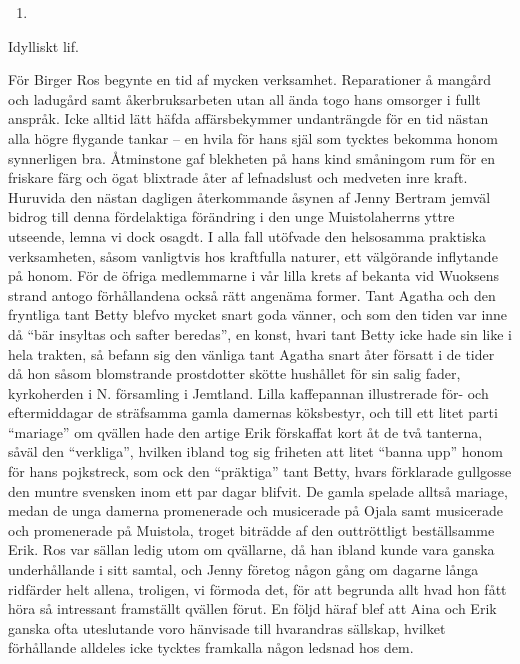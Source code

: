 \begin{enumerate}
\def\labelenumi{\arabic{enumi}.}
\setcounter{enumi}{17}
\tightlist
\item
\end{enumerate}

Idylliskt lif.

För Birger Ros begynte en tid af mycken verksamhet. Reparationer å
mangård och ladugård samt åkerbruksarbeten utan all ända togo hans
omsorger i fullt anspråk. Icke alltid lätt häfda affärsbekymmer
undanträngde för en tid nästan alla högre flygande tankar -- en hvila
för hans själ som tycktes bekomma honom synnerligen bra. Åtminstone gaf
blekheten på hans kind småningom rum för en friskare färg och ögat
blixtrade åter af lefnadslust och medveten inre kraft. Huruvida den
nästan dagligen återkommande åsynen af Jenny Bertram jemväl bidrog till
denna fördelaktiga förändring i den unge Muistolaherrns yttre utseende,
lemna vi dock osagdt. I alla fall utöfvade den helsosamma praktiska
verksamheten, såsom vanligtvis hos kraftfulla naturer, ett välgörande
inflytande på honom. För de öfriga medlemmarne i vår lilla krets af
bekanta vid Wuoksens strand antogo förhållandena också rätt angenäma
former. Tant Agatha och den fryntliga tant Betty blefvo mycket snart
goda vänner, och som den tiden var inne då ``bär insyltas och safter
beredas'', en konst, hvari tant Betty icke hade sin like i hela trakten,
så befann sig den vänliga tant Agatha snart åter försatt i de tider då
hon såsom blomstrande prostdotter skötte hushållet för sin salig fader,
kyrkoherden i N. församling i Jemtland. Lilla kaffepannan illustrerade
för- och eftermiddagar de sträfsamma gamla damernas köksbestyr, och till
ett litet parti ``mariage'' om qvällen hade den artige Erik förskaffat
kort åt de två tanterna, såväl den ``verkliga'', hvilken ibland tog sig
friheten att litet ``banna upp'' honom för hans pojkstreck, som ock den
``präktiga'' tant Betty, hvars förklarade gullgosse den muntre svensken
inom ett par dagar blifvit. De gamla spelade alltså mariage, medan de
unga damerna promenerade och musicerade på Ojala samt musicerade och
promenerade på Muistola, troget biträdde af den outtröttligt
beställsamme Erik. Ros var sällan ledig utom om qvällarne, då han ibland
kunde vara ganska underhållande i sitt samtal, och Jenny företog någon
gång om dagarne långa ridfärder helt allena, troligen, vi förmoda det,
för att begrunda allt hvad hon fått höra så intressant framställt
qvällen förut. En följd häraf blef att Aina och Erik ganska ofta
uteslutande voro hänvisade till hvarandras sällskap, hvilket förhållande
alldeles icke tycktes framkalla någon ledsnad hos dem.

